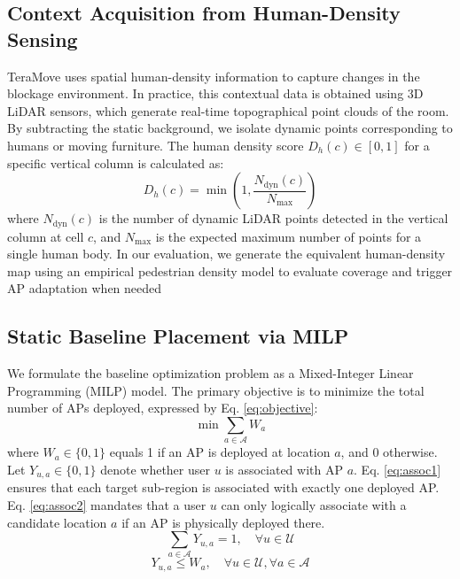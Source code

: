 \documentclass[conference]{IEEEtran}
\begin{document}
	\subsection{Context Acquisition from Human-Density Sensing}
	
	TeraMove uses spatial human-density information to capture changes in the blockage environment. In practice, this contextual data is obtained using 3D LiDAR sensors, which generate real-time topographical point clouds of the room. By subtracting the static background, we isolate dynamic points corresponding to humans or moving furniture. The human density score $D_h(c) \in [0,1]$ for a specific vertical column is calculated as:
	\begin{equation}
		D_h(c) = \min \left(1, \frac{N_{\text{dyn}}(c)}{N_{\text{max}}} \right)
	\end{equation}
	where $N_{\text{dyn}}(c)$ is the number of dynamic LiDAR points detected in the vertical column at cell $c$, and $N_{\text{max}}$ is the expected maximum number of points for a single human body. In our evaluation, we generate the equivalent human-density map using an empirical pedestrian density model to evaluate coverage and trigger AP adaptation when needed
	
	
	
	\subsection{Static Baseline Placement via MILP}
	
	We formulate the baseline optimization problem as a Mixed-Integer Linear Programming (MILP) model. The primary objective is to minimize the total number of APs deployed, expressed by Eq. \eqref{eq:objective}:
	\begin{equation}
		\min \sum_{a \in \mathcal{A}} W_a
		\label{eq:objective}
	\end{equation}
	where $W_a \in \{0,1\}$ equals 1 if an AP is deployed at location $a$, and 0 otherwise. Let $Y_{u,a} \in \{0,1\}$ denote whether user $u$ is associated with AP $a$. Eq. \eqref{eq:assoc1} ensures that each target sub-region is associated with exactly one deployed AP. Eq. \eqref{eq:assoc2} mandates that a user $u$ can only logically associate with a candidate location $a$ if an AP is physically deployed there.
	\begin{equation}
		\sum_{a \in \mathcal{A}} Y_{u,a} = 1, \quad \forall u \in \mathcal{U}
		\label{eq:assoc1}
	\end{equation}
	\begin{equation}
		Y_{u,a} \le W_a, \quad \forall u \in \mathcal{U}, \forall a \in \mathcal{A}
		\label{eq:assoc2}
	\end{equation}
	
\end{document}
